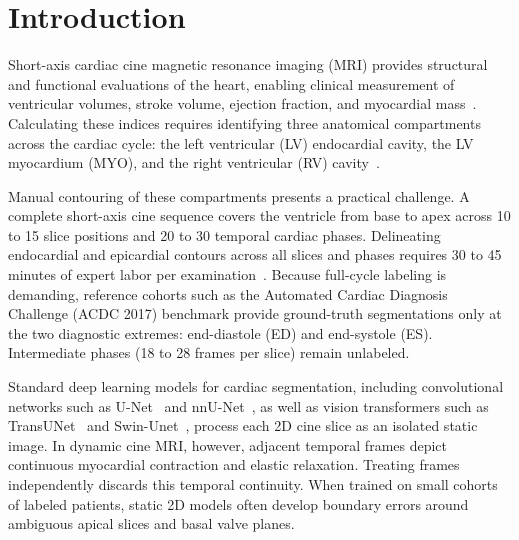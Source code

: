 \documentclass[pdflatex,sn-mathphys]{sn-jnl}
\theoremstyle{thmstyleone}
\theoremstyle{thmstyletwo}
\theoremstyle{thmstylethree}
\begin{document}

\maketitle

\section{Introduction}\label{sec:intro}

Short-axis cardiac cine magnetic resonance imaging (MRI) provides structural and functional evaluations of the heart, enabling clinical measurement of ventricular volumes, stroke volume, ejection fraction, and myocardial mass~\cite{bernard2018deep,chen2020deep}. Calculating these indices requires identifying three anatomical compartments across the cardiac cycle: the left ventricular (LV) endocardial cavity, the LV myocardium (MYO), and the right ventricular (RV) cavity~\cite{petitjean2011review}.

Manual contouring of these compartments presents a practical challenge. A complete short-axis cine sequence covers the ventricle from base to apex across 10 to 15 slice positions and 20 to 30 temporal cardiac phases. Delineating endocardial and epicardial contours across all slices and phases requires 30 to 45 minutes of expert labor per examination~\cite{chen2020deep}. Because full-cycle labeling is demanding, reference cohorts such as the Automated Cardiac Diagnosis Challenge (ACDC 2017) benchmark provide ground-truth segmentations only at the two diagnostic extremes: end-diastole (ED) and end-systole (ES). Intermediate phases (18 to 28 frames per slice) remain unlabeled.

Standard deep learning models for cardiac segmentation, including convolutional networks such as U-Net~\cite{ronneberger2015u} and nnU-Net~\cite{isensee2021nnu}, as well as vision transformers such as TransUNet~\cite{chen2021transunet} and Swin-Unet~\cite{cao2022swin}, process each 2D cine slice as an isolated static image. In dynamic cine MRI, however, adjacent temporal frames depict continuous myocardial contraction and elastic relaxation. Treating frames independently discards this temporal continuity. When trained on small cohorts of labeled patients, static 2D models often develop boundary errors around ambiguous apical slices and basal valve planes.
\end{document}
